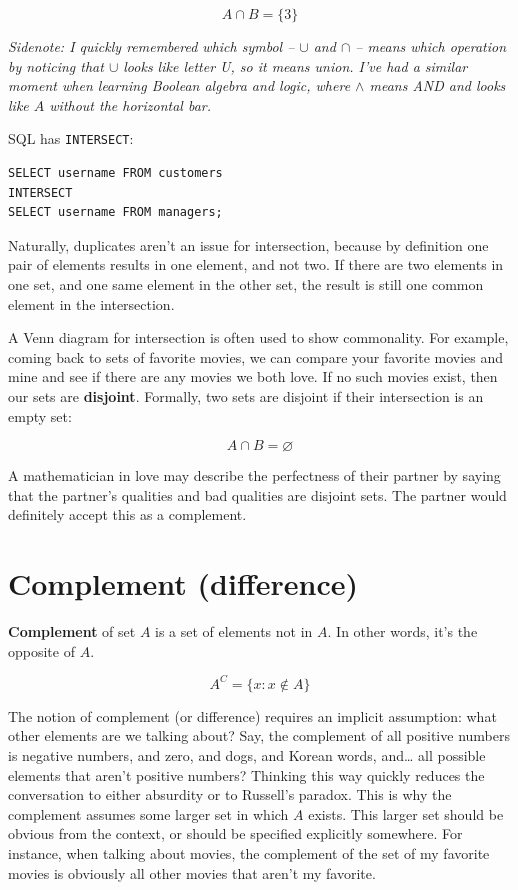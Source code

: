 \documentclass[12pt, a4paper, justified, notitlepage, sfsidenotes, notoc]{book}
\begin{document}
\begin{equation}
A \cap B = \{3\}
\end{equation}

\emph{Sidenote: I quickly remembered which symbol -- \(\cup\) and \(\cap\) -- means which operation by noticing that \(\cup\) looks like letter U, so it means union. I've had a similar moment when learning Boolean algebra and logic, where \(\wedge\) means AND and looks like \(A\) without the horizontal bar.}

SQL has \texttt{INTERSECT}:

\begin{verbatim}
SELECT username FROM customers
INTERSECT
SELECT username FROM managers;
\end{verbatim}

Naturally, duplicates aren't an issue for intersection, because by definition one pair of elements results in one element, and not two. If there are two elements in one set, and one same element in the other set, the result is still one common element in the intersection.

A Venn diagram for intersection is often used to show commonality. For example, coming back to sets of favorite movies, we can compare your favorite movies and mine and see if there are any movies we both love. If no such movies exist, then our sets are \textbf{\textbf{disjoint}}. Formally, two sets are disjoint if their intersection is an empty set:

\begin{equation}
A \cap B = \varnothing
\end{equation}

A mathematician in love may describe the perfectness of their partner by saying that the partner's qualities and bad qualities are disjoint sets. The partner would definitely accept this as a complement.

\section{Complement (difference)}
\label{sec:org2e32783}

\textbf{\textbf{Complement}} of set \(A\) is a set of elements not in \(A\). In other words, it's the opposite of \(A\).

\begin{equation}
A^{C} = \{x : x \notin A \}
\end{equation}

The notion of complement (or difference) requires an implicit assumption: what other elements are we talking about? Say, the complement of all positive numbers is negative numbers, and zero, and dogs, and Korean words, and\ldots{} all possible elements that aren't positive numbers? Thinking this way quickly reduces the conversation to either absurdity or to Russell's paradox. This is why the complement assumes some larger set in which \(A\) exists. This larger set should be obvious from the context, or should be specified explicitly somewhere. For instance, when talking about movies, the complement of the set of my favorite movies is obviously all other movies that aren't my favorite.
\end{document}
